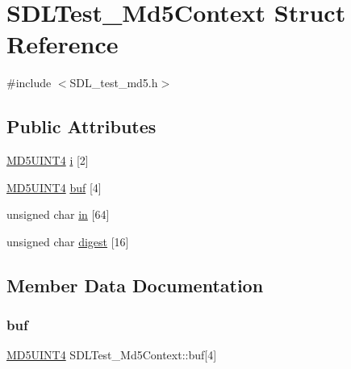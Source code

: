 \hypertarget{struct_s_d_l_test___md5_context}{}\section{S\+D\+L\+Test\+\_\+\+Md5\+Context Struct Reference}
\label{struct_s_d_l_test___md5_context}


{\ttfamily \#include $<$S\+D\+L\+\_\+test\+\_\+md5.\+h$>$}

\subsection*{Public Attributes}
\begin{DoxyCompactItemize}
\item 
\hyperlink{_s_d_l__test__md5_8h_a2bdcfd1b3373be8191c70eb4a7cb84c6}{M\+D5\+U\+I\+N\+T4} \hyperlink{struct_s_d_l_test___md5_context_a95b3d5fd74fd1b7a27bf96f3bb32beb4}{i} \mbox{[}2\mbox{]}
\item 
\hyperlink{_s_d_l__test__md5_8h_a2bdcfd1b3373be8191c70eb4a7cb84c6}{M\+D5\+U\+I\+N\+T4} \hyperlink{struct_s_d_l_test___md5_context_a061f0cead7ec49ac4c5baf0bbd9c13a7}{buf} \mbox{[}4\mbox{]}
\item 
unsigned char \hyperlink{struct_s_d_l_test___md5_context_a337638ef799dc0ad9397ea9b175ea388}{in} \mbox{[}64\mbox{]}
\item 
unsigned char \hyperlink{struct_s_d_l_test___md5_context_ab29079997a9f35e5d52c2aac3ad28f90}{digest} \mbox{[}16\mbox{]}
\end{DoxyCompactItemize}


\subsection{Member Data Documentation}
\mbox{\label{struct_s_d_l_test___md5_context_a061f0cead7ec49ac4c5baf0bbd9c13a7}} 
\subsubsection{\texorpdfstring{buf}{buf}}
{\footnotesize\ttfamily \hyperlink{_s_d_l__test__md5_8h_a2bdcfd1b3373be8191c70eb4a7cb84c6}{M\+D5\+U\+I\+N\+T4} S\+D\+L\+Test\+\_\+\+Md5\+Context\+::buf\mbox{[}4\mbox{]}}

